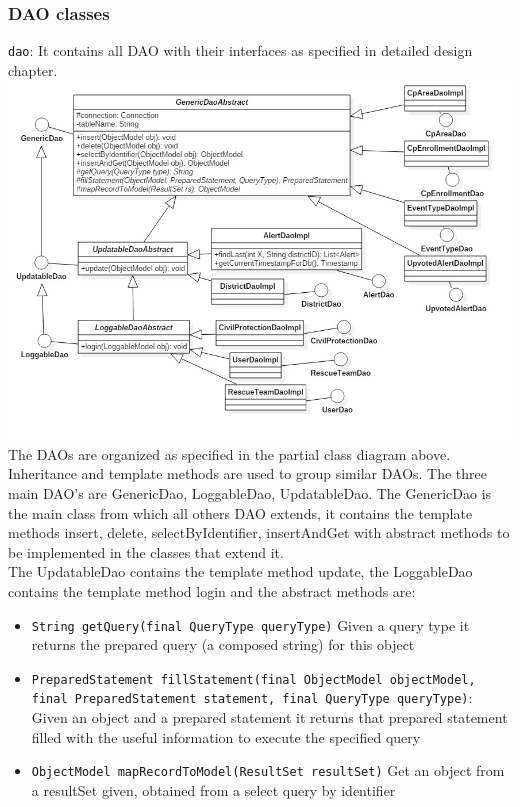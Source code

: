 \documentclass[a4paper,12pt]{report}
\begin{document}
\subsubsection{DAO classes}
\texttt{dao}: It contains all DAO with their interfaces as specified in detailed design chapter.\\
\includegraphics[width=\textwidth]{figures/ClassDiagram.jpg}
The DAOs are organized as specified in the partial class diagram above. Inheritance and template methods are used to group similar DAOs. The three main DAO's are GenericDao, LoggableDao, UpdatableDao. The GenericDao is the main class from which all others DAO extends, it contains the template methods insert, delete, selectByIdentifier, insertAndGet with abstract methods to be implemented in the classes that extend it.\\
The UpdatableDao contains the template method update, the LoggableDao contains the template method login and the abstract methods are:
\begin{itemize}
\item \texttt{String getQuery(final QueryType queryType)} Given a query type it returns the prepared query (a composed string) for this object
\item \texttt{PreparedStatement fillStatement(final ObjectModel objectModel, \\final PreparedStatement statement, final QueryType queryType)}: Given an object and a prepared statement it returns that prepared statement filled with the useful information to execute the specified query
\item \texttt{ObjectModel mapRecordToModel(ResultSet resultSet)} Get an object from a resultSet given, obtained from a select query by identifier
\end{itemize}
\end{document}
